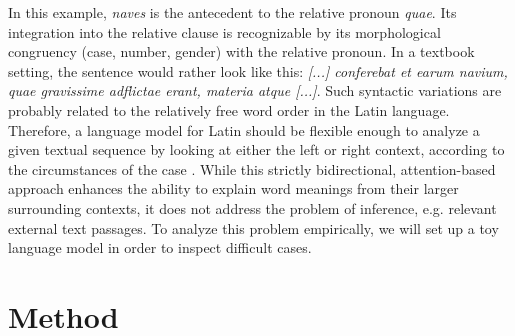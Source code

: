 \documentclass[oneside]{book}
\begin{document}
In this example, \textit{naves} is the antecedent to the relative pronoun \textit{quae}. Its integration into the relative clause is recognizable by its morphological congruency (case, number, gender) with the relative pronoun. In a textbook setting, the sentence would rather look like this: \textit{[...] conferebat et earum navium, quae gravissime adflictae erant, materia atque [...]}. Such syntactic variations are probably related to the relatively free word order in the Latin language. Therefore, a language model for Latin should be flexible enough to analyze a given textual sequence by looking at either the left or right context, according to the circumstances of the case \parencite[8]{devlinBERTPretrainingDeep2019}. While this strictly bidirectional, attention-based approach \parencite{vaswaniAttentionAllYou2017} enhances the ability to explain word meanings from their larger surrounding contexts, it does not address the problem of inference, e.g. relevant external text passages. To analyze this problem empirically, we will set up a toy language model in order to inspect difficult cases. 

\chapter{Method}
\end{document}
